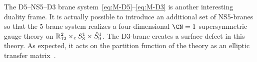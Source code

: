 The D5--NS5--D3 brane system~\eqref{eq:M-D5}--\eqref{eq:M-D3} is
another interesting duality frame.  It is actually possible to
introduce an additional set of NS5-branes so that the 5-brane system
realizes a four-dimensional $\CN = 1$ supersymmetric gauge theory on
$\mathbb{R}^2_{12} \times_\epsilon S^1_3 \times \check S^1_9$.  The D3-brane
creates a surface defect in this theory.  As expected, it acts on the
partition function of the theory as an elliptic transfer
matrix~\cite{Maruyoshi:2016caf,Yagi:2017hmj}.








